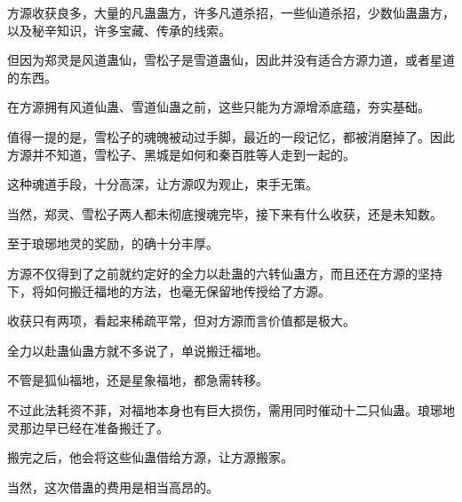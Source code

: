 \begin{this_body}
方源收获良多，大量的凡蛊蛊方，许多凡道杀招，一些仙道杀招，少数仙蛊蛊方，以及秘辛知识，许多宝藏、传承的线索。

但因为郑灵是风道蛊仙，雪松子是雪道蛊仙，因此并没有适合方源力道，或者星道的东西。

在方源拥有风道仙蛊、雪道仙蛊之前，这些只能为方源增添底蕴，夯实基础。

值得一提的是，雪松子的魂魄被动过手脚，最近的一段记忆，都被消磨掉了。因此方源并不知道，雪松子、黑城是如何和秦百胜等人走到一起的。

这种魂道手段，十分高深，让方源叹为观止，束手无策。

当然，郑灵、雪松子两人都未彻底搜魂完毕，接下来有什么收获，还是未知数。

至于琅琊地灵的奖励，的确十分丰厚。

方源不仅得到了之前就约定好的全力以赴蛊的六转仙蛊方，而且还在方源的坚持下，将如何搬迁福地的方法，也毫无保留地传授给了方源。

收获只有两项，看起来稀疏平常，但对方源而言价值都是极大。

全力以赴蛊仙蛊方就不多说了，单说搬迁福地。

不管是狐仙福地，还是星象福地，都急需转移。

不过此法耗资不菲，对福地本身也有巨大损伤，需用同时催动十二只仙蛊。琅琊地灵那边早已经在准备搬迁了。

搬完之后，他会将这些仙蛊借给方源，让方源搬家。

当然，这次借蛊的费用是相当高昂的。

\end{this_body}

